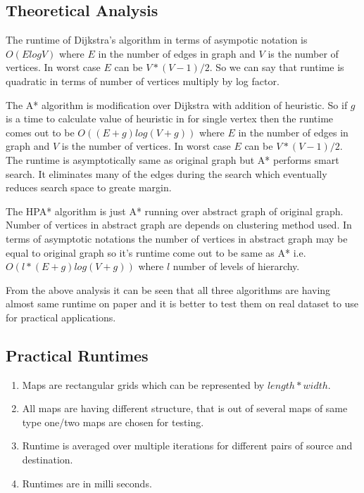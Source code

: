 \documentclass[a4paper, 12pt]{article}
\begin{document}
\subsection{Theoretical Analysis}
\par
\hspace{1cm}
The runtime of Dijkstra's algorithm in terms of asympotic notation is $O(ElogV)$ where $E$ in the number of edges in graph and $V$ is the number of vertices. In worst case $E$ can be $V*(V-1)/2$. So we can say that runtime is quadratic in terms of number of vertices multiply by log factor.
\\
\par
\hspace{1cm}
The A* algorithm is modification over Dijkstra with addition of heuristic. So if $g$ is a time to calculate value of heuristic in for single vertex then the runtime comes out to be $O((E+g)log(V+g))$ where $E$ in the number of edges in graph and $V$ is the number of vertices. In worst case $E$ can be $V*(V-1)/2$. The runtime is asymptotically same as original graph but A* performs smart search. It eliminates many of the edges during the search which eventually reduces search space to greate margin.
\\
\par
\hspace{1cm}
The HPA* algorithm is just A* running over abstract graph of original graph. Number of vertices in abstract graph are depends on clustering method used. In terms of asymptotic notations the number of vertices in abstract graph may be equal to original graph so it's runtime come out to be same as A* i.e. $O(l*(E+g)log(V+g))$ where $l$ number of levels of hierarchy.
\\
\par
\hspace{1cm}
From the above analysis it can be seen that all three algorithms are having almost same runtime on paper and it is better to test them on real dataset to use for practical applications.

\newpage
 
\subsection{Practical Runtimes}
\begin{enumerate}
\item Maps are rectangular grids which can be represented by $length*width$.
\item All maps are having different structure, that is out of several maps of same type one/two maps are chosen for testing.
\item Runtime is averaged over multiple iterations for different pairs of source and destination.
\item Runtimes are in milli seconds.
\end{enumerate}
\par
\end{document}
